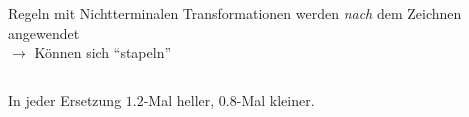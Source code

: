 \documentclass{beamer}
\theoremstyle{example}
\begin{document}
\begin{frame}{Regeln mit Nichtterminalen}
Transformationen werden \emph{nach} dem Zeichnen angewendet\\
$\longrightarrow$ Können sich ``stapeln''\pause
\begin{columns}
\column{6cm}
\pause
\column{4cm}
\begin{center}
\end{center}
\end{columns}\medskip
In jeder Ersetzung $1.2$-Mal heller, $0.8$-Mal kleiner.
\end{frame}
\end{document}
